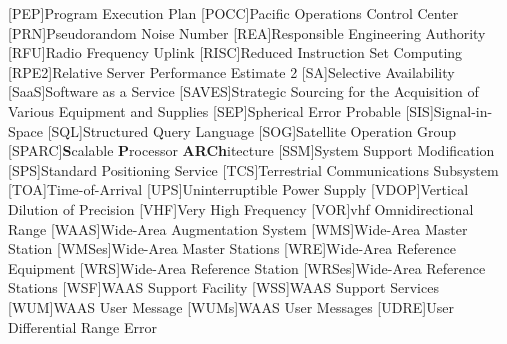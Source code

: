 \begin{acronym}[WAAS]
[PEP]{Program Execution Plan}
[POCC]{Pacific Operations Control Center}
[PRN]{Pseudorandom Noise Number}
[REA]{Responsible Engineering Authority}
[RFU]{Radio Frequency Uplink}
[RISC]{Reduced Instruction Set Computing}
[RPE2]{Relative Server Performance Estimate 2}
[SA]{Selective Availability}
[SaaS]{Software as a Service}
[SAVES]{Strategic Sourcing for the Acquisition of Various Equipment and Supplies}
[SEP]{Spherical Error Probable}
[SIS]{Signal-in-Space}
[SQL]{Structured Query Language}
[SOG]{Satellite Operation Group}
[SPARC]{\textbf{S}calable \textbf{P}rocessor \textbf{ARCh}itecture}
[SSM]{System Support Modification}
[SPS]{Standard Positioning Service}
[TCS]{Terrestrial Communications Subsystem}
[TOA]{Time-of-Arrival}
[UPS]{Uninterruptible Power Supply}
[VDOP]{Vertical Dilution of Precision}
[VHF]{Very High Frequency}
[VOR]{\ac{vhf} Omnidirectional Range}
[WAAS]{Wide-Area Augmentation System}
[WMS]{Wide-Area Master Station}
[WMSes]{Wide-Area Master Stations}
[WRE]{Wide-Area Reference Equipment}
[WRS]{Wide-Area Reference Station}
[WRSes]{Wide-Area Reference Stations}
[WSF]{WAAS Support Facility}
[WSS]{WAAS Support Services}
[WUM]{WAAS User Message}
[WUMs]{WAAS User Messages}
[UDRE]{User Differential Range Error}
\end{acronym}

